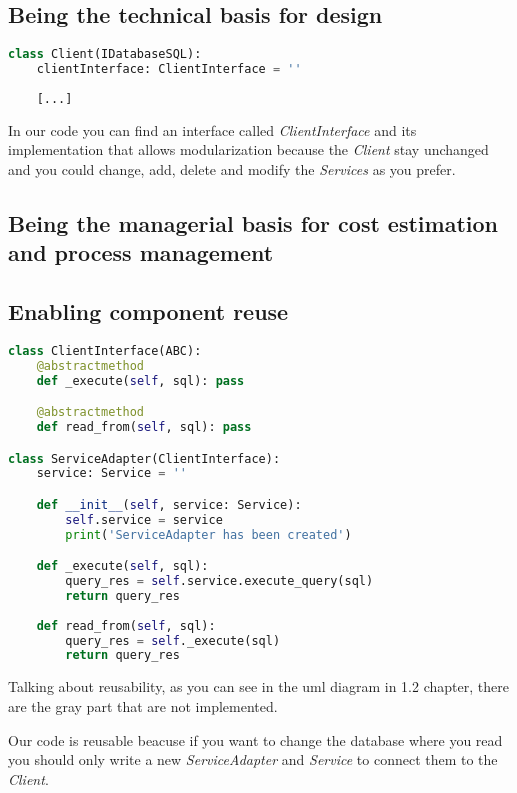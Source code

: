 \subsection{Being the technical basis for design}

\begin{lstlisting}[language=Python]
class Client(IDatabaseSQL): 
	clientInterface: ClientInterface = ''
	
	[...]
\end{lstlisting}

In our code you can find an interface called \textit{ClientInterface} and its implementation that allows modularization because the \textit{Client} stay unchanged and you could change, add, delete and modify the \textit{Services} as you prefer.

\subsection{Being the managerial basis for cost estimation and process management}

\subsection{Enabling component reuse}

\begin{lstlisting}[language=Python]
class ClientInterface(ABC):
    @abstractmethod
    def _execute(self, sql): pass

    @abstractmethod
    def read_from(self, sql): pass

class ServiceAdapter(ClientInterface):
    service: Service = ''

    def __init__(self, service: Service):
        self.service = service
        print('ServiceAdapter has been created')

    def _execute(self, sql):
        query_res = self.service.execute_query(sql)
        return query_res
    
    def read_from(self, sql):
        query_res = self._execute(sql) 
        return query_res
\end{lstlisting}

Talking about reusability, as you can see in the uml diagram in 1.2 chapter, there are the gray part that are not implemented. 



Our code is reusable beacuse if you want to change the database where you read you should only write a new \textit{ServiceAdapter} and \textit{Service} to connect them to the \textit{Client}.

